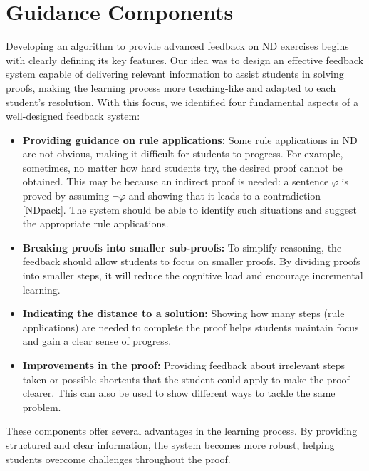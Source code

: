 \section{Guidance Components}
Developing an algorithm to provide advanced feedback on ND exercises begins with clearly defining its key features. Our idea was to design an effective feedback system capable of delivering relevant information to assist students in solving proofs, making the learning process more teaching-like and adapted to each student’s resolution. With this focus, we identified four fundamental aspects of a well-designed feedback system:

\begin{itemize}

\item \textbf {Providing guidance on rule applications:} Some rule applications in ND are not obvious, making it difficult for students to progress. For example, sometimes, no matter how hard students try, the desired proof cannot be obtained. This may be because an indirect proof is needed: a sentence \(\varphi\) is proved by assuming \(\neg \varphi\) and showing that it leads to a contradiction [NDpack]. The system should be able to identify such situations and suggest the appropriate rule applications.

\item \textbf {Breaking proofs into smaller sub-proofs:} To simplify reasoning, the feedback should allow students to focus on smaller proofs. By dividing proofs into smaller steps, it will reduce the cognitive load and encourage incremental learning. 

\item \textbf{Indicating the distance to a solution:} Showing how many steps (rule applications) are needed to complete the proof helps students maintain focus and gain a clear sense of progress.

\item \textbf{Improvements in the proof:} Providing feedback about irrelevant steps taken or possible shortcuts that the student could apply to make the proof clearer. This can also be used to show different ways to tackle the same problem.

\end{itemize}

These components offer several advantages in the learning process. By providing structured and clear information, the system becomes more robust, helping students overcome challenges throughout the proof.